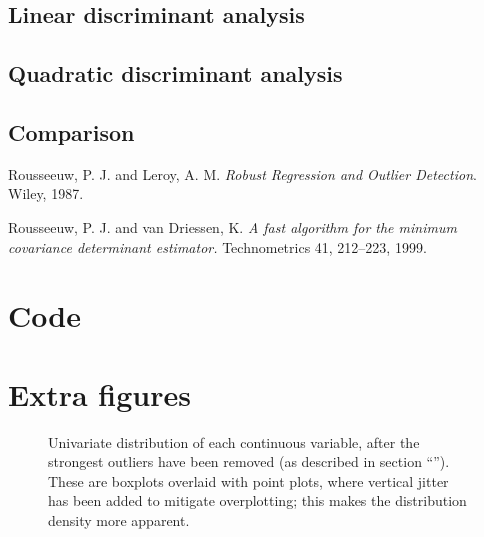 \documentclass[a4paper, 12pt]{article}
\newcommand{\wide}[1]{\makebox[\textwidth][c]{#1}%
}
\newcommand{\widefig}[1]{\wide{\texttt{[image: \#1]}}}
\newcommand{\sectionref}[1]{section ``\nameref{#1}''}
\begin{document}
\subsection*{Linear discriminant analysis}
\subsection*{Quadratic discriminant analysis}
\subsection*{Comparison}


\begin{thebibliography}{9}
Rousseeuw, P. J. and Leroy, A. M. 
\textit{Robust Regression and Outlier Detection}. 
Wiley, 1987.

Rousseeuw, P. J. and van Driessen, K.
\textit{A fast algorithm for the minimum covariance determinant estimator.}
Technometrics 41, 212–223, 1999.
\end{thebibliography}


\clearpage
\appendix

\section{Code}
\FloatBarrier
{}







\clearpage
\FloatBarrier
\section{Extra figures}

\begin{figure}
  \widefig{img/jitterbox_engine_capacity}
  \widefig{img/jitterbox_urban_metric}
  \widefig{img/jitterbox_extra_urban_metric}
  \widefig{img/jitterbox_combined_metric}
  \widefig{img/jitterbox_noise_level}
  \widefig{img/jitterbox_co2}
  \widefig{img/jitterbox_co_emissions}
  \widefig{img/jitterbox_nox_emissions}
  \caption{Univariate distribution of each continuous variable, after the strongest outliers have been removed (as described in \sectionref{outlier_removal}). These are boxplots overlaid with point plots, where vertical jitter has been added to mitigate overplotting; this makes the distribution density more apparent.}
  \label{jitterboxes}
\end{figure}
\end{document}
